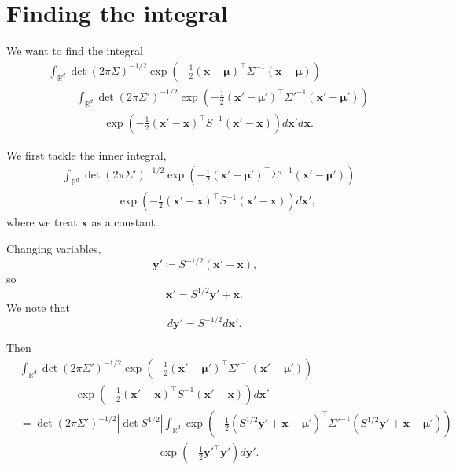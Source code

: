 \documentclass[oneside, 11pt]{article}
\begin{document}
\appendix
\section{Finding the integral}
\label{sec:integral}

    We want to find the integral\begin{align*}
        &\int_{\mathbb{R}^d} \det(2\pi\Sigma)^{-1/2} \exp\left(-\frac12 \left(\mathbf{x}-\bm{\mu}\right)^\top \Sigma^{-1} \left(\mathbf{x}-\bm{\mu}\right) \right) \\
        &\hspace{30pt} \int_{\mathbb{R}^d} \det(2\pi\Sigma')^{-1/2} \exp\left(-\frac12 \left(\mathbf{x}'-\bm{\mu}'\right)^\top \Sigma'^{-1} \left(\mathbf{x'}-\bm{\mu}'\right) \right) \\
        &\hspace{60pt}\exp\left(-\frac12 \left(\mathbf{x}'-\mathbf{x}\right)^\top S^{-1} \left(\mathbf{x}'-\mathbf{x}\right) \right) d\mathbf{x}' d\mathbf{x} \text{.}
    \end{align*}

    We first tackle the inner integral, \begin{align*}
        &\int_{\mathbb{R}^d} \det(2\pi\Sigma')^{-1/2} \exp\left(-\frac12 \left(\mathbf{x}'-\bm{\mu}'\right)^\top \Sigma'^{-1} \left(\mathbf{x'}-\bm{\mu}'\right) \right) \\
        &\hspace{60pt}\exp\left(-\frac12 \left(\mathbf{x}'-\mathbf{x}\right)^\top S^{-1} \left(\mathbf{x}'-\mathbf{x}\right) \right) d\mathbf{x}' \text{,}
    \end{align*} where we treat $\mathbf{x}$ as a constant.

    Changing variables, \[
        \mathbf{y}' \coloneqq S^{-1/2} (\mathbf{x}' - \mathbf{x}) \text{,}
    \] so\[
        \mathbf{x}' = S^{1/2} \mathbf{y}' + \mathbf{x} \text{.}
    \] We note that \[
        d\mathbf{y}' = S^{-1/2} d\mathbf{x}' \text{.}
    \]

    Then \begin{align*}
        &\int_{\mathbb{R}^d} \det(2\pi\Sigma')^{-1/2} \exp\left(-\frac12 \left(\mathbf{x}'-\bm{\mu}'\right)^\top \Sigma'^{-1} \left(\mathbf{x'}-\bm{\mu}'\right) \right) \\
        &\hspace{60pt}\exp\left(-\frac12 \left(\mathbf{x}'-\mathbf{x}\right)^\top S^{-1} \left(\mathbf{x}'-\mathbf{x}\right) \right) d\mathbf{x}' \\
        &= \det(2\pi\Sigma')^{-1/2} \left|\det S^{1/2}\right| \int_{\mathbb{R}^d} \exp\left(-\frac12 \left(S^{1/2} \mathbf{y}' + \mathbf{x} - \bm{\mu}'\right)^\top \Sigma'^{-1} \left(S^{1/2} \mathbf{y}' + \mathbf{x} - \bm{\mu}'\right) \right) \\
        &\hspace{150pt}\exp\left(-\frac12 \mathbf{y}'^\top \mathbf{y}' \right)  d\mathbf{y}' \text{.}
    \end{align*}
\end{document}
